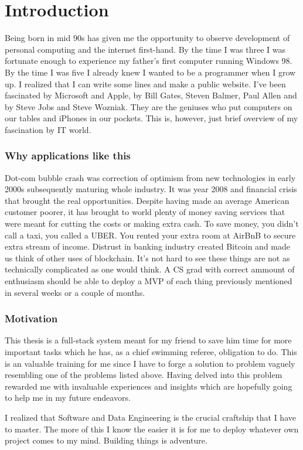 \chapter*{Introduction}
\par
Being born in mid 90s has given me the  opportunity to observe development of personal computing and the internet first-hand. By the time I was three I was fortunate enough to experience my father's first computer running Windows 98. By the time I was five I already knew I wanted to be a programmer when I grow up. I realized that I can write some lines and make a public website. I've been fascinated by Microsoft and Apple, by Bill Gates, Steven Balmer, Paul Allen and by Steve Jobs and Steve Wozniak. They are the geniuses who put computers on our tables and iPhones in our pockets. This is, however, just brief overview of my fascination by IT world.
\subsection*{Why applications like this}
\par
Dot-com bubble crash was correction of optimism from new technologies in early 2000s subsequently maturing whole industry. It was year 2008 and financial crisis that brought the real opportunities. Despite having made an average American customer poorer, it has brought to world plenty of money saving services that were meant for cutting the costs or making extra cash. To save money, you didn't call a taxi, you called a UBER. You rented your extra room at AirBnB to secure extra stream of income. Distrust in banking industry created Bitcoin and made us think of other uses of blockchain. It's not hard to see these things are not as technically complicated as one would think. A CS grad with correct ammount of enthusiasm should be able to deploy a MVP of each thing previously mentioned in several weeks or a couple of months.
\subsection*{Motivation}
\par
This thesis is a full-stack system meant for my friend to save him time for more important tasks which he has, as a chief swimming referee, obligation to do. This is an valuable training for me since I have to forge a solution to problem vaguely resembling one of the problems listed above. Having delved into this problem rewarded me with invaluable experiences and insights which are hopefully going to help me in my future endeavors.
\par
I realized that Software and Data Engineering is the crucial craftship that I have to master. The more of this I know the easier it is for me to deploy whatever own project comes to my mind. Building things is adventure.
